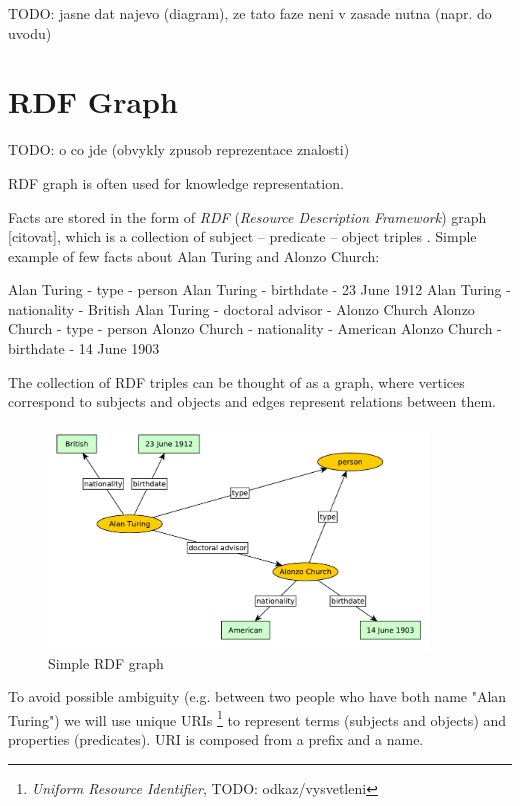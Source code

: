 \documentclass[a4paper, 12pt, twoside]{fithesis2}		%
\renewcommand{\_}{\leavevmode \kern0.0em\vbox{\hrule width0.4em}}
\begin{document}
TODO: jasne dat najevo (diagram), ze tato faze neni v zasade nutna (napr. do uvodu)


\section{RDF Graph}
\label{sec:rdf-graph}

TODO: o co jde (obvykly zpusob reprezentace znalosti)


RDF graph is often used for knowledge representation.

Facts are stored in the form of \textit{RDF} (\textit{Resource Description Framework}) graph [citovat],
which is a collection of subject -- predicate -- object triples \parencite[][63]{semantic-web}. Simple example of few facts about Alan Turing and Alonzo Church:

\begin{code}
Alan Turing - type - person
Alan Turing - birthdate - 23 June 1912
Alan Turing - nationality - British
Alan Turing - doctoral advisor - Alonzo Church
Alonzo Church - type - person
Alonzo Church - nationality - American
Alonzo Church - birthdate - 14 June 1903
\end{code}

The collection of RDF triples can be thought of as a graph,
where vertices correspond to subjects and objects
and edges represent relations between them.

\begin{figure}[h]
  \centering
  \includegraphics[width=0.9\textwidth]{images/rdf-graph.pdf}
  \caption{Simple RDF graph}
  \label{fig:simple-rdf-graph}
\end{figure}

To avoid possible ambiguity (e.g. between two people who have both name "Alan Turing")
we will use unique URIs%
\footnote{\emph{Uniform Resource Identifier}, TODO: odkaz/vysvetleni}
to represent terms (subjects and objects) and properties (predicates).
URI is composed from a prefix and a name.
\end{document}
